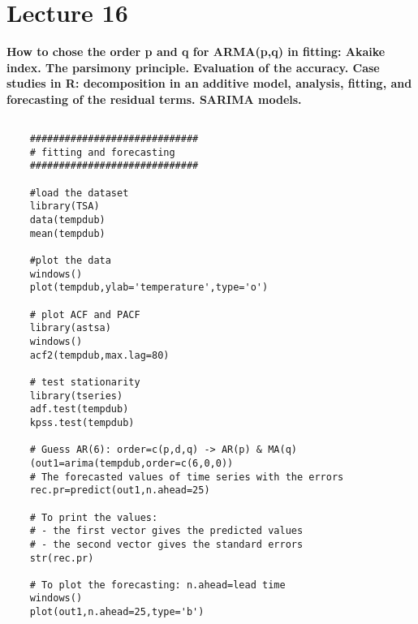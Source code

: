 \section{Lecture 16}
\label{lecture16}

\begin{center}
    \textbf{How to chose the order p and q for ARMA(p,q) in fitting: Akaike index. The parsimony principle. Evaluation of the accuracy. Case studies in R: decomposition in an additive model, analysis, fitting, and forecasting of the residual terms. SARIMA models.}
\end{center}

\begin{example}
    \begin{verbatim}

    #############################
    # fitting and forecasting
    #############################
    
    #load the dataset
    library(TSA)
    data(tempdub)
    mean(tempdub)
    
    #plot the data
    windows()
    plot(tempdub,ylab='temperature',type='o')
    
    # plot ACF and PACF
    library(astsa)
    windows()
    acf2(tempdub,max.lag=80)
    
    # test stationarity
    library(tseries)
    adf.test(tempdub)
    kpss.test(tempdub)
    
    # Guess AR(6): order=c(p,d,q) -> AR(p) & MA(q)
    (out1=arima(tempdub,order=c(6,0,0))
    # The forecasted values of time series with the errors
    rec.pr=predict(out1,n.ahead=25)
    
    # To print the values:
    # - the first vector gives the predicted values
    # - the second vector gives the standard errors
    str(rec.pr)
    
    # To plot the forecasting: n.ahead=lead time
    windows()
    plot(out1,n.ahead=25,type='b')
    \end{verbatim}
\end{example}


